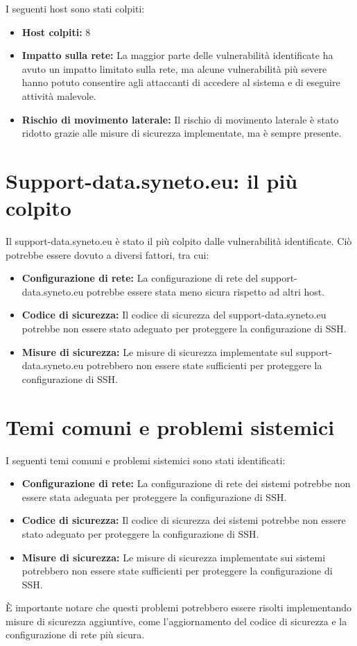 I seguenti host sono stati colpiti:
\begin{itemize}
\item \textbf{Host colpiti:} 8
\item \textbf{Impatto sulla rete:} La maggior parte delle vulnerabilità identificate ha avuto un impatto limitato sulla rete, ma alcune vulnerabilità più severe hanno potuto consentire agli attaccanti di accedere al sistema e di eseguire attività malevole.
\item \textbf{Rischio di movimento laterale:} Il rischio di movimento laterale è stato ridotto grazie alle misure di sicurezza implementate, ma è sempre presente.
\end{itemize}
\section{Support-data.syneto.eu: il più colpito}

Il support-data.syneto.eu è stato il più colpito dalle vulnerabilità identificate. Ciò potrebbe essere dovuto a diversi fattori, tra cui:
\begin{itemize}
\item \textbf{Configurazione di rete:} La configurazione di rete del support-data.syneto.eu potrebbe essere stata meno sicura rispetto ad altri host.
\item \textbf{Codice di sicurezza:} Il codice di sicurezza del support-data.syneto.eu potrebbe non essere stato adeguato per proteggere la configurazione di SSH.
\item \textbf{Misure di sicurezza:} Le misure di sicurezza implementate sul support-data.syneto.eu potrebbero non essere state sufficienti per proteggere la configurazione di SSH.
\end{itemize}
\section{Temi comuni e problemi sistemici}

I seguenti temi comuni e problemi sistemici sono stati identificati:
\begin{itemize}
\item \textbf{Configurazione di rete:} La configurazione di rete dei sistemi potrebbe non essere stata adeguata per proteggere la configurazione di SSH.
\item \textbf{Codice di sicurezza:} Il codice di sicurezza dei sistemi potrebbe non essere stato adeguato per proteggere la configurazione di SSH.
\item \textbf{Misure di sicurezza:} Le misure di sicurezza implementate sui sistemi potrebbero non essere state sufficienti per proteggere la configurazione di SSH.
\end{itemize}
È importante notare che questi problemi potrebbero essere risolti implementando misure di sicurezza aggiuntive, come l'aggiornamento del codice di sicurezza e la configurazione di rete più sicura.


